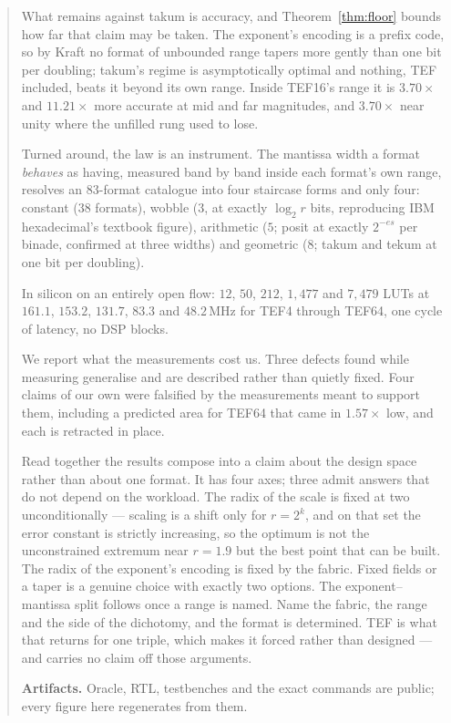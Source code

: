 \documentclass[11pt]{article}
\theoremstyle{definition}
\begin{document}
\begin{abstract}
What remains against takum is accuracy, and Theorem~\ref{thm:floor} bounds how far
that claim may be taken. The exponent's encoding is a prefix code, so by Kraft no
format of unbounded range tapers more gently than one bit per doubling; takum's
regime is asymptotically optimal and nothing, TEF included, beats it beyond its
own range. Inside TEF16's range it is $3.70\times$ and $11.21\times$ more accurate
at mid and far magnitudes, and $3.70\times$ near unity where the unfilled rung
used to lose.

Turned around, the law is an instrument. The mantissa width a format
\emph{behaves} as having, measured band by band inside each format's own range,
resolves an 83-format catalogue into four staircase forms and only four: constant
(38 formats), wobble (3, at exactly $\log_2 r$ bits, reproducing IBM
hexadecimal's textbook figure), arithmetic ($5$; posit at exactly $2^{-es}$ per
binade, confirmed at three widths) and geometric ($8$; takum and tekum at one bit
per doubling).

In silicon on an entirely open flow: $12$, $50$, $212$, $1{,}477$ and $7{,}479$
LUTs at $161.1$, $153.2$, $131.7$, $83.3$ and $48.2$\,MHz for TEF4 through
TEF64, one cycle of latency, no DSP blocks.

We report what the measurements cost us. Three defects found while measuring
generalise and are described rather than quietly fixed. Four claims of our own
were falsified by the measurements meant to support them, including a predicted
area for TEF64 that came in $1.57\times$ low, and each is retracted in place.

Read together the results compose into a claim about the design space rather than
about one format. It has four axes; three admit answers that do not depend on the
workload. The radix of the scale is fixed at two unconditionally --- scaling is a
shift only for $r = 2^{k}$, and on that set the error constant is strictly
increasing, so the optimum is not the unconstrained extremum near $r = 1.9$ but
the best point that can be built. The radix of the exponent's encoding is fixed by
the fabric. Fixed fields or a taper is a genuine choice with exactly two options.
The exponent--mantissa split follows once a range is named. Name the fabric, the
range and the side of the dichotomy, and the format is determined. TEF is what
that returns for one triple, which makes it forced rather than designed --- and
carries no claim off those arguments.

\medskip
\noindent\textbf{Artifacts.} Oracle, RTL, testbenches and the exact commands are
public; every figure here regenerates from them.
\end{abstract}
\end{document}
